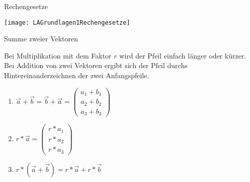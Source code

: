 \begin{bla}{Rechengesetze}
  \begin{marginfigure}[10em]
    \texttt{[image: LAGrundlagen1Rechengesetze]}
    \caption{Summe zweier Vektoren}
  \end{marginfigure}
  Bei Multiplikation mit dem Faktor $r$ wird der Pfeil einfach länger oder kürzer.
  Bei Addition von zwei Vektoren ergibt sich der Pfeil durchs Hintereinanderzeichnen der zwei Anfangspfeile.
  \begin{enumerate}
    \item $\vec{a} + \vec{b} = \vec{b} + \vec{a} = \begin{pmatrix}
      a_1 + b_1 \\ a_2 + b_2 \\ a_3 + b_3
    \end{pmatrix}$
    \item $r * \vec{a} =
    \begin{pmatrix}
      r * a_1 \\ r* a_2 \\ r * a_3
    \end{pmatrix}$
    \item $r * (\vec{a} + \vec{b}) = r*\vec{a} + r*\vec{b}$
  \end{enumerate}
\end{bla}

